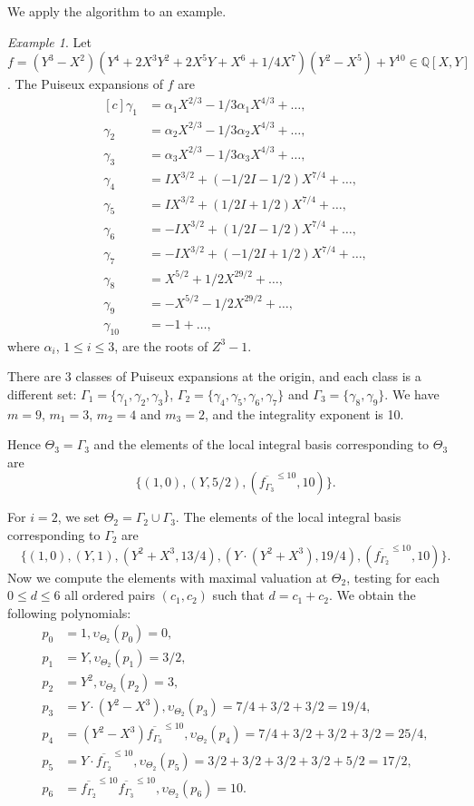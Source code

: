 \documentclass[a4paper,11pt]{amsart}%
\theoremstyle{definition}
\theoremstyle{plain}
\theoremstyle{remark}
\newtheorem{example}[defn]{Example}
\begin{document}
We apply the algorithm to an example.

\begin{example}
Let $f = (Y^3-X^2)(Y^4 + 2X^3Y^2 + 2X^5Y + X^6 + 1/4X^7)(Y^2-X^5) + Y^{10} \in{\mathbb{Q}}[X,Y]$.
The Puiseux expansions of $f$ are
$$
\begin{aligned}[c]
\gamma_{1} &=\alpha_1 X^{2/3} - 1/3 \alpha_1 X^{4/3} + \dots,\\
\gamma_{2} &=\alpha_2 X^{2/3} - 1/3 \alpha_2 X^{4/3} + \dots,\\
\gamma_{3} &=\alpha_3 X^{2/3} - 1/3 \alpha_3 X^{4/3} + \dots,\\
\gamma_{4} &=IX^{3/2} +(-1/2I-1/2)X^{7/4} + \dots,\\
\gamma_{5} &=IX^{3/2} +(1/2I+1/2)X^{7/4} + \dots,\\
\gamma_{6} &=-IX^{3/2}+(1/2I-1/2)X^{7/4} + \dots,\\
\gamma_{7} &=-IX^{3/2}+(-1/2I+1/2)X^{7/4} + \dots,\\
\gamma_{8} &=X^{5/2}+ 1/2  X^{29/2} + \dots,\\
\gamma_{9} &=-X^{5/2} - 1/2  X^{29/2} +  \dots,\\
\gamma_{10} &=-1 + \dots,
\end{aligned}
$$
where $\alpha_{i}$, $1 \le i \le 3$, are the roots of $Z^{3}-1$.

There are 3 classes of Puiseux expansions at the origin, and each class is a different set: $\Gamma_1 = \{\gamma_1, \gamma_2, \gamma_3\}$, $\Gamma_2 = \{\gamma_4, \gamma_5, \gamma_6, \gamma_7\}$ and $\Gamma_3 = \{\gamma_8, \gamma_9\}$. We have $m=9$, $m_{1} = 3$, $m_2 = 4$  and $m_{3} = 2$, and the integrality exponent is 10.

Hence $\Theta_{3} = \Gamma_{3}$ and
the elements of the local integral basis corresponding to $\Theta_{3}$ are
$$\{(1, 0), (Y, 5/2), (\overline{f_{\Gamma_3}}^{\le 10}, 10)\}.$$

For $i = 2$, we set $\Theta_{2} = \Gamma_2 \cup \Gamma_3$. The
elements of the local integral basis corresponding to $\Gamma_{2}$ are
$$\{(1, 0), (Y,
1), (Y^2+X^3, 13/4), (Y\cdot(Y^2 + X^3), 19/4), (\overline{f_{\Gamma_2}}^{\le 10}, 10)\}.$$
Now we compute the elements with maximal valuation at $\Theta_2$, testing for each $0 \le d \le 6$ all ordered pairs $(c_1, c_2)$ such that $d = c_1 + c_2$. We obtain the following polynomials:
$$
\begin{aligned}
p_0 &= 1, \upsilon_{\Theta_2}(p_0) = 0, \\
p_1 &= Y, \upsilon_{\Theta_2}(p_1) = 3/2, \\
p_2 &= Y^2, \upsilon_{\Theta_2}(p_2) = 3, \\
p_3 &= Y\cdot(Y^2-X^3), \upsilon_{\Theta_2}(p_3) = 7/4+3/2+3/2 = 19/4, \\
p_4 &= (Y^2-X^3)\overline{f_{\Gamma_3}}^{\le 10}, \upsilon_{\Theta_2}(p_4) = 7/4+3/2+3/2+3/2 = 25/4,\\
p_5 &= Y\cdot\overline{f_{\Gamma_2}}^{\le 10}, \upsilon_{\Theta_2}(p_5) = 3/2+3/2+3/2+3/2+5/2 = 17/2, \\
p_6 &= \overline{f_{\Gamma_2}}^{\le 10}\overline{f_{\Gamma_3}}^{\le 10}, \upsilon_{\Theta_2}(p_6) = 10.
\end{aligned}
$$


\end{example}
\end{document}
